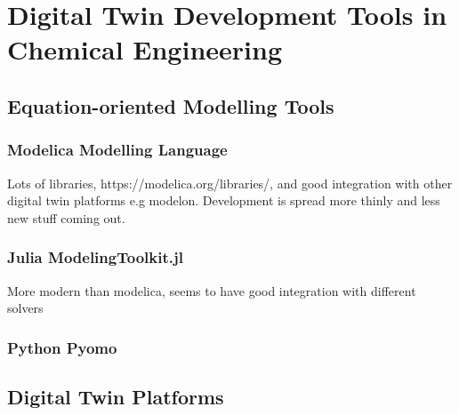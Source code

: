 \section{Digital Twin Development Tools in Chemical Engineering}


\subsection{Equation-oriented Modelling Tools}








\subsubsection{Modelica Modelling Language}

Lots of libraries, https://modelica.org/libraries/, and good integration with other digital twin platforms e.g modelon. Development is spread more thinly and less new stuff coming out.


\subsubsection{Julia ModelingToolkit.jl}

More modern than modelica, seems to have good integration with different solvers


\subsubsection{Python Pyomo}



\subsection{Digital Twin Platforms}




